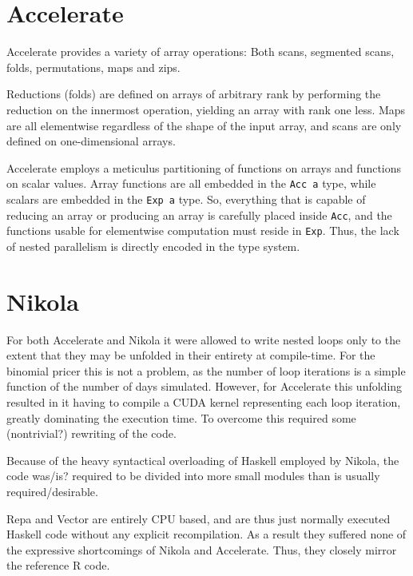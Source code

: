 \section{Accelerate}

Accelerate provides a variety of array operations: Both scans, segmented
scans, folds, permutations, maps and zips.

Reductions (folds) are defined on arrays of arbitrary rank by performing the
reduction on the innermost operation, yielding an array with rank one less.
Maps are all elementwise regardless of the shape of the input array, and scans
are only defined on one-dimensional arrays.

Accelerate employs a meticulus partitioning of functions on arrays and functions
on scalar values. Array functions are all embedded in the \texttt{Acc a} type,
while scalars are embedded in the \texttt{Exp a} type. So, everything that is
capable of reducing an array or producing an array is carefully placed inside
\texttt{Acc}, and the functions usable for elementwise computation must
reside in \texttt{Exp}. Thus, the lack of nested parallelism is directly
encoded in the type system.



\section{Nikola}

For both Accelerate and Nikola it were allowed to write nested loops only to
the extent that they may be unfolded in their entirety at compile-time. For the
binomial pricer this is not a problem, as the number of loop iterations is a
simple function of the number of days simulated.   However, for Accelerate this unfolding resulted in it
having to compile a CUDA kernel representing each loop iteration, greatly
dominating the execution time. To overcome this required some (nontrivial?)
rewriting of the code.

Because of the heavy syntactical overloading of Haskell employed by Nikola, the
code was/is? required to be divided into more small modules than is usually
required/desirable.

Repa and Vector are entirely CPU based, and are thus just normally executed
Haskell code without any explicit recompilation. As a result they suffered none
of the expressive shortcomings of Nikola and Accelerate. Thus, they closely
mirror the reference R code.

